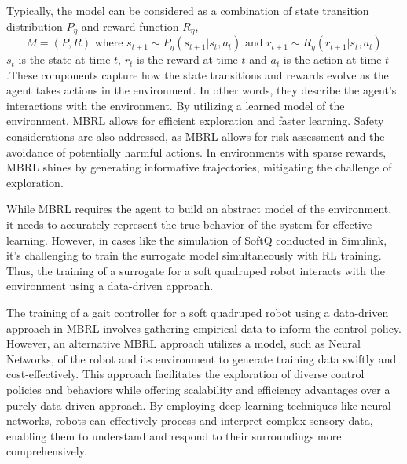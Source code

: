 Typically, the model can be considered as a combination of state transition distribution $P_\eta$ and reward function $R_\eta$, $$M = (P,R) \textrm{ where } s_{t+1}\sim P_\eta(s_{t+1}|s_t, a_t) \textrm{ and } r_{t+1}\sim R_\eta(r_{t+1}|s_t, a_t)$$ $s_t$ is the state at time $t$, $r_t$ is the reward at time $t$ and $a_t$ is the action at time $t$.These components capture how the state transitions and rewards evolve as the agent takes actions in the environment. In other words, they describe the agent's interactions with the environment. By utilizing a learned model of the environment, \ac{MBRL} allows for efficient exploration and faster learning. Safety considerations are also addressed, as MBRL allows for risk assessment and the avoidance of potentially harmful actions. In environments with sparse rewards, MBRL shines by generating informative trajectories, mitigating the challenge of exploration.

While MBRL requires the agent to build an abstract model of the environment, it needs to accurately represent the true behavior of the system for effective learning. However, in cases like the simulation of SoftQ conducted in Simulink, it's challenging to train the surrogate model simultaneously with RL training. Thus, the training of a surrogate for a soft quadruped robot interacts with the environment using a data-driven approach.

The training of a gait controller for a soft quadruped robot using a data-driven approach in \ac{MBRL} involves gathering empirical data to inform the control policy. However, an alternative MBRL approach utilizes a model, such as Neural Networks, of the robot and its environment to generate training data swiftly and cost-effectively.  This approach facilitates the exploration of diverse control policies and behaviors while offering scalability and efficiency advantages over a purely data-driven approach. By employing deep learning techniques like neural networks, robots can effectively process and interpret complex sensory data, enabling them to understand and respond to their surroundings more comprehensively.

